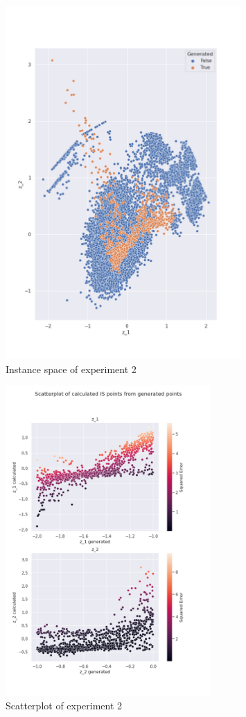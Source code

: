 \begin{figure}[H]
    \centering
    \includegraphics[width=0.8\textwidth]{Cap5/all_coords2.png}
    \caption{Instance space of experiment 2}
    \label{fig:is_exp2}
\end{figure}

\begin{figure}[H]
    \centering
    \includegraphics[width=0.7\textwidth]{Cap5/scatterplot2}
    \caption{Scatterplot of experiment 2}
    \label{fig:scatter_exp2}
\end{figure}

